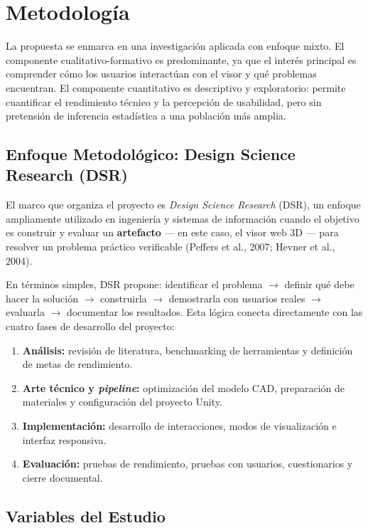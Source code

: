 \section{Metodolog\'ia}

La propuesta se enmarca en una investigaci\'on aplicada con enfoque mixto. El componente cualitativo-formativo es predominante, ya que el inter\'es principal es comprender c\'omo los usuarios interact\'uan con el visor y qu\'e problemas encuentran. El componente cuantitativo es descriptivo y exploratorio: permite cuantificar el rendimiento t\'ecnico y la percepci\'on de usabilidad, pero sin pretensi\'on de inferencia estad\'istica a una poblaci\'on m\'as amplia.

\subsection{Enfoque Metodol\'ogico: Design Science Research (DSR)}

El marco que organiza el proyecto es \textit{Design Science Research} (DSR), un enfoque ampliamente utilizado en ingenier\'ia y sistemas de informaci\'on cuando el objetivo es construir y evaluar un \textbf{artefacto} — en este caso, el visor web 3D — para resolver un problema pr\'actico verificable (Peffers et al., 2007; Hevner et al., 2004).

En t\'erminos simples, DSR propone: identificar el problema $\rightarrow$ definir qu\'e debe hacer la soluci\'on $\rightarrow$ construirla $\rightarrow$ demostrarla con usuarios reales $\rightarrow$ evaluarla $\rightarrow$ documentar los resultados. Esta l\'ogica conecta directamente con las cuatro fases de desarrollo del proyecto:

\begin{enumerate}
    \item \textbf{An\'alisis:} revisi\'on de literatura, benchmarking de herramientas y definici\'on de metas de rendimiento.
    \item \textbf{Arte t\'ecnico y \textit{pipeline}:} optimizaci\'on del modelo CAD, preparaci\'on de materiales y configuraci\'on del proyecto Unity.
    \item \textbf{Implementaci\'on:} desarrollo de interacciones, modos de visualizaci\'on e interfaz responsiva.
    \item \textbf{Evaluaci\'on:} pruebas de rendimiento, pruebas con usuarios, cuestionarios y cierre documental.
\end{enumerate}

\subsection{Variables del Estudio}


